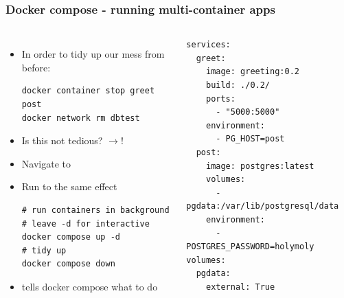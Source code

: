 \begin{frame}[fragile]
	\frametitle{Docker compose - running multi-container apps}
	\begin{columns}
		\begin{itemize}
			\item In order to tidy up our mess from before:
			\begin{lstlisting}
docker container stop greet post
docker network rm dbtest
			\end{lstlisting}
			\item Is this not tedious? $\rightarrow$!
			\item Navigate to 
			\item Run to the same effect
			\begin{lstlisting}
# run containers in background
# leave -d for interactive
docker compose up -d
# tidy up
docker compose down
			\end{lstlisting}
			\item {} tells docker compose what to do
		\end{itemize}
		
		\begin{lstlisting}
services:
  greet:
    image: greeting:0.2
    build: ./0.2/
	ports:
	  - "5000:5000"
	environment:
	  - PG_HOST=post
  post:
	image: postgres:latest
	volumes:
	  - pgdata:/var/lib/postgresql/data
	environment:
	  - POSTGRES_PASSWORD=holymoly
volumes:
  pgdata:
	external: True
		\end{lstlisting}
	\end{columns}
\end{frame}

